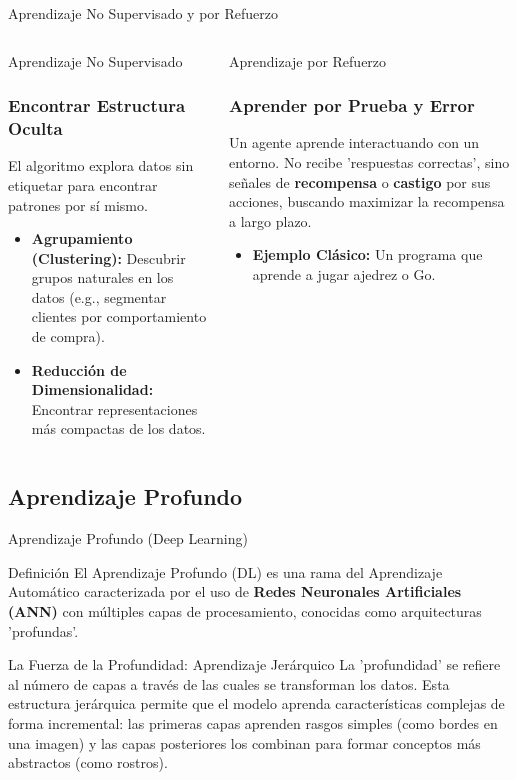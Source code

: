 \documentclass[aspectratio=169,xcolor=dvipsnames]{beamer}
\begin{document}
\begin{frame}{Aprendizaje No Supervisado y por Refuerzo}
    \begin{columns}[t]
            \begin{block}{Aprendizaje No Supervisado}
            \frametitle{Encontrar Estructura Oculta}
                El algoritmo explora datos sin etiquetar para encontrar patrones por sí mismo.
                \begin{itemize}
                    \item \textbf{Agrupamiento (Clustering):} Descubrir grupos naturales en los datos (e.g., segmentar clientes por comportamiento de compra).
                    \item \textbf{Reducción de Dimensionalidad:} Encontrar representaciones más compactas de los datos.
                \end{itemize}
            \end{block}

            \begin{alertblock}{Aprendizaje por Refuerzo}
            \frametitle{Aprender por Prueba y Error}
                Un agente aprende interactuando con un entorno. No recibe 'respuestas correctas', sino señales de \textbf{recompensa} o \textbf{castigo} por sus acciones, buscando maximizar la recompensa a largo plazo.
                \begin{itemize}
                    \item \textbf{Ejemplo Clásico:} Un programa que aprende a jugar ajedrez o Go.
                \end{itemize}
            \end{alertblock}
    \end{columns}
\end{frame}

\subsection{Aprendizaje Profundo}

\begin{frame}{Aprendizaje Profundo (Deep Learning)}
    \begin{block}{Definición}
    El Aprendizaje Profundo (DL) es una rama del Aprendizaje Automático caracterizada por el uso de \textbf{Redes Neuronales Artificiales (ANN)} con múltiples capas de procesamiento, conocidas como arquitecturas 'profundas'.
    \end{block}
    
    \begin{alertblock}{La Fuerza de la Profundidad: Aprendizaje Jerárquico}
    La 'profundidad' se refiere al número de capas a través de las cuales se transforman los datos. Esta estructura jerárquica permite que el modelo aprenda características complejas de forma incremental: las primeras capas aprenden rasgos simples (como bordes en una imagen) y las capas posteriores los combinan para formar conceptos más abstractos (como rostros).
    \end{alertblock}
\end{frame}
\end{document}
